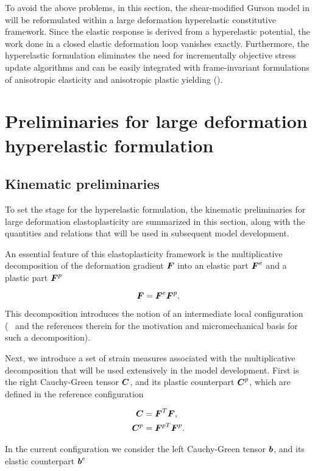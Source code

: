 To avoid the above problems, in this section, the shear-modified Gurson model in \cite{Nahshon2008, Nahshon2009} will be reformulated within a large deformation hyperelastic constitutive framework. Since the elastic response is derived from a hyperelastic potential, the work done in a closed elastic deformation loop vanishes exactly. Furthermore, the hyperelastic formulation eliminates the need for incrementally objective stress update algorithms and can be easily integrated with frame-invariant formulations of anisotropic elasticity and anisotropic plastic yielding (\cite{Belytschko2013}).

\section{Preliminaries for large deformation hyperelastic formulation}

\subsection{Kinematic preliminaries}
To set the stage for the hyperelastic formulation, the kinematic
preliminaries for large deformation elastoplasticity are summarized
in this section, along with the quantities and relations that will be used in
subsequent model development.

An essential feature of this elastoplasticity framework is the
multiplicative decomposition of the deformation gradient ${\boldsymbol{F}}$ into an
elastic part ${\boldsymbol{F}}^e$ and a plastic part ${\boldsymbol{F}}^p$

\begin{equation}
  {\boldsymbol{F}} = {\boldsymbol{F}}^e{\boldsymbol{F}}^p.
\end{equation}

This decomposition introduces the notion of an intermediate local
configuration (\cf\ \cite{SimoHughes:98} and the references
therein for the motivation and micromechanical basis for such a
decomposition).

Next, we introduce a set of strain measures associated with the
multiplicative decomposition that will be used extensively in the
model development. First is the right Cauchy-Green tensor ${\boldsymbol{C}}$, and
its plastic counterpart ${\boldsymbol{C}}^p$, which are defined in the reference configuration

\begin{align}
  {\boldsymbol{C}} &= {\boldsymbol{F}}^T {\boldsymbol{F}},\\
  {\boldsymbol{C}}^p &= {\boldsymbol{F}}^{pT} {\boldsymbol{F}}^p.
\end{align}

In the current configuration we consider the left
Cauchy-Green tensor ${\boldsymbol{b}}$, and its elastic counterpart ${{\boldsymbol{b}}}^e$

